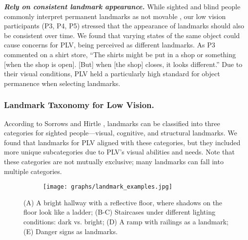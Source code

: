 \textit{\textbf{Rely on consistent landmark appearance.}}
While sighted and blind people commonly interpret permanent landmarks as not movable \cite{burnett1998turn,wang2023understanding}, our low vision participants (P3, P4, P5) stressed that the appearance of landmarks should also be consistent over time. We found that varying states of the same object could cause concerns for PLV, being perceived as different landmarks. As P3 commented on a shirt store, ``The shirts might be put in a shop or something [when the shop is open]. [But] when [the shop] closes, it looks different.'' Due to their visual conditions, PLV held a particularly high standard for object permanence when selecting landmarks.%



\subsubsection{Landmark Taxonomy for Low Vision.}\label{Landmark Taxonomy for Low Vision.}
According to Sorrows and Hirtle \cite{sorrows1999nature}, landmarks can be classified into three categories for sighted people---visual, cognitive, and structural landmarks. We found that landmarks for PLV aligned with these categories, but they included more unique subcategories due to PLV's visual abilities and needs. Note that these categories are not mutually exclusive; many landmarks can fall into multiple categories.%



\begin{figure*}[t]
    \centering
    \begin{subfigure}{0.99\textwidth}
        \centering
        \texttt{[image: graphs/landmark\_examples.jpg]}
    \end{subfigure}
    \caption{(A) A bright hallway with a reflective floor, where shadows on the floor look like a ladder; (B-C) Staircases under different lighting conditions: dark vs. bright; (D) A ramp with railings as a landmark; (E) Danger signs as landmarks.} 
    \label{fig:landmark_examples}
\end{figure*}

